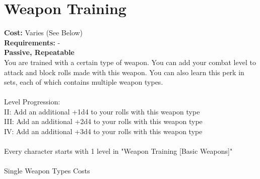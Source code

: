 \section{Weapon Training}
\textbf{Cost:} Varies (See Below)\\
\textbf{Requirements:} -\\
\textbf{Passive, Repeatable}\\

You are trained with a certain type of weapon. You can add your combat level to attack and block rolls made with this weapon. You can also learn this perk in sets, each of which contains multiple weapon types.\\
\\
Level Progression:\\
II: Add an additional +1d4 to your rolls with this weapon type\\
III: Add an additional +2d4 to your rolls with this weapon type\\
IV: Add an additional +3d4 to your rolls with this weapon type\\
\\
Every character starts with 1 level in "Weapon Training [Basic Weapons]"\\
\\
Single Weapon Types Costs\\
